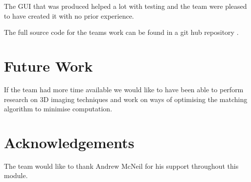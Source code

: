 \documentclass[twocolumn]{article}
\begin{document}
The GUI that was produced helped a lot with testing and the team were pleased to have created it with no prior experience.   

The full source code for the teams work can be found in a git hub repository \cite{githublink}.

\section{Future Work} 
\vspace{-1ex}

If the team had more time available we would like to have been able to perform research on 3D imaging techniques and work on ways of optimising the matching algorithm to minimise computation. 


\section*{Acknowledgements}
The team would like to thank Andrew McNeil for his support throughout this module.





\end{document}
